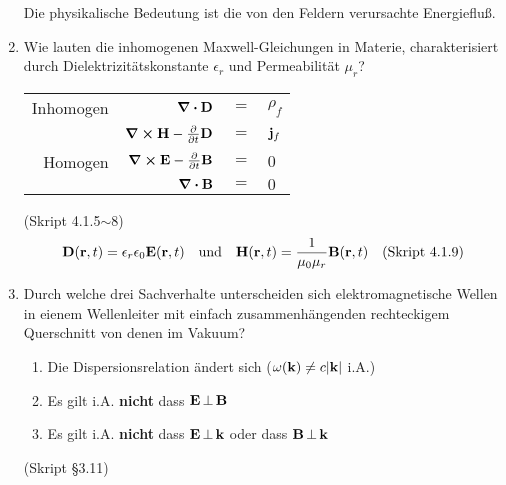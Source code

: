 \documentclass{scrartcl}
\newcommand{\sref}[1]{(Skript #1)}
\newcommand{\smref}[1]{\quad\text{(Skript #1)}}
\begin{document}
\begin{enumerate}
          \begin{center}
            Die physikalische Bedeutung ist die von den 
            Feldern verursachte Energiefluß.
          \end{center}

    \clearpage
    \item Wie lauten die inhomogenen Maxwell-Gleichungen in Materie,
          charakterisiert durch Dielektrizitätskonstante $\epsilon_r$ und
          Permeabilität $\mu_r$?
          \begin{center}
            \begin{tabular}{rrcl}
              Inhomogen&$\div \vb D$ & $=$ &$\rho_f$\\
              &$\curl \vb H-\pdv{t}\vb D$ & $=$ &$\vb j_f$\\
              Homogen&$\curl \vb E-\pdv{t}\vb B$ & $=$ &$0$\\
              &$\div \vb B$ & $=$ &$0$\\
            \end{tabular}
            \sref{4.1.5$\sim$8}
            $$\vb D(\vb r,t)=\epsilon_r\epsilon_0\vb E(\vb r,t) \quad
            \text{und}\quad\vb H(\vb r, t)=\frac{1}{\mu_0\mu_r}
            \vb B(\vb r,t)\smref{4.1.9}$$
          \end{center}

    \item Durch welche drei Sachverhalte unterscheiden sich 
          elektromagnetische Wellen in eienem Wellenleiter mit einfach
          zusammenhängenden rechteckigem Querschnitt von denen im Vakuum?
          \begin{enumerate}
            \item Die Dispersionsrelation ändert sich 
                  ($\omega(\vb k)\ne c\abs{\vb k}$ i.A.)
            \item Es gilt i.A. \textbf{nicht} dass $\vb E\,\bot\,\vb B$
            \item Es gilt i.A. \textbf{nicht} dass $\vb E\,\bot\,\vb k$
                  oder dass $\vb B\,\bot\,\vb k$
          \end{enumerate}
          \begin{center}
            \sref{§3.11}
          \end{center}


\end{enumerate}
\end{document}
